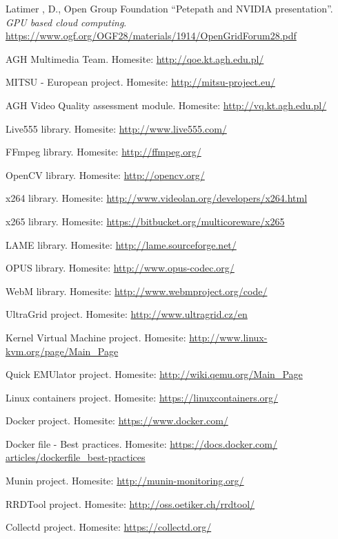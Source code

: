 \documentclass[english,final]{setup/eetac_tfc_pfc}
\begin{document}
\begin{thebibliography}{2}
Latimer , D., Open Group Foundation
``Petepath and NVIDIA presentation''. {\it GPU based cloud computing}.
\url{https://www.ogf.org/OGF28/materials/1914/OpenGridForum28.pdf}

AGH Multimedia Team. Homesite: \url{http://qoe.kt.agh.edu.pl/}

MITSU - European project. Homesite: \url{http://mitsu-project.eu/}

AGH Video Quality assessment module. Homesite: \url{http://vq.kt.agh.edu.pl/}

Live555 library. Homesite: \url{http://www.live555.com/}

FFmpeg library. Homesite: \url{http://ffmpeg.org/}

OpenCV library. Homesite: \url{http://opencv.org/}

x264 library. Homesite: \url{http://www.videolan.org/developers/x264.html}

x265 library. Homesite: \url{https://bitbucket.org/multicoreware/x265}

LAME library. Homesite: \url{http://lame.sourceforge.net/}

OPUS library. Homesite: \url{http://www.opus-codec.org/}

WebM library. Homesite: \url{http://www.webmproject.org/code/}

UltraGrid project. Homesite: \url{http://www.ultragrid.cz/en}

Kernel Virtual Machine project. Homesite: \url{http://www.linux-kvm.org/page/Main_Page}

Quick EMUlator project. Homesite: \url{http://wiki.qemu.org/Main_Page}

Linux containers project. Homesite: \url{https://linuxcontainers.org/}

Docker project. Homesite: \url{https://www.docker.com/}

Docker file - Best practices. Homesite: \url{https://docs.docker.com/
articles/dockerfile_best-practices}

Munin project. Homesite: \url{http://munin-monitoring.org/}

RRDTool project. Homesite: \url{http://oss.oetiker.ch/rrdtool/}

Collectd project. Homesite: \url{https://collectd.org/}


\end{thebibliography}
\end{document}
